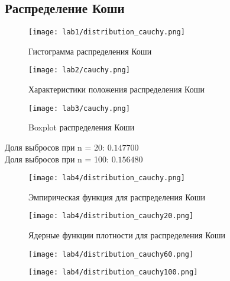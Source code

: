 \documentclass[a4]{article}
\begin{document}
\subsection{Распределение Коши}
	\begin{figure}[H]
	\caption{Гистограмма распределения Коши}
	\texttt{[image: lab1/distribution\_cauchy.png]}
	\end{figure}
	\begin{figure}[H]
	\caption{Характеристики положения распределения Коши}
	\texttt{[image: lab2/cauchy.png]}
	\end{figure}
	\begin{figure}[H]
	\caption{Boxplot распределения Коши }
	\texttt{[image: lab3/cauchy.png]}
	\end{figure}
	Доля выбросов при n = 20: $0.147700$\\
	Доля выбросов при n = 100: $0.156480$
	\begin{figure}[H]
	\caption{Эмпирическая функция для распределения Коши}
	\texttt{[image: lab4/distribution\_cauchy.png]}
	\end{figure}
	\begin{figure}[H]
	\caption{Ядерные функции плотности для распределения Коши}
	\texttt{[image: lab4/distribution\_cauchy20.png]}
	\end{figure}
	\begin{figure}[H]
	\texttt{[image: lab4/distribution\_cauchy60.png]}
	\end{figure}
	\begin{figure}[H]
	\texttt{[image: lab4/distribution\_cauchy100.png]}
	\end{figure}
\newpage
\end{document}
